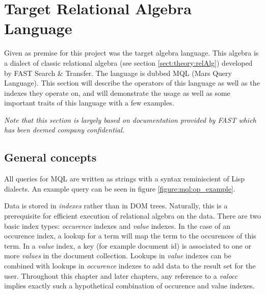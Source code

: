 \section{Target Relational Algebra Language}
\label{sect:method:mql}
Given as premise for this project was the target algebra language. This
algebra is a dialect of classic relational algebra (see section
\ref{sect:theory:relAlg}) developed by FAST Search \& Transfer. The language
is dubbed MQL (Mars Query Language). This section will describe the operators
of this language as well as the indexes they operate on, and will demonstrate
the usage as well as some important traits of this language with a few
examples.

\emph{Note that this section is largely based on documentation provided by FAST which
has been deemed company confidential. }

\subsection{General concepts}
\label{sect:method:mql:indexes}
\label{sect:method:mql:concepts}
All queries for MQL are written as strings with a syntax reminiscient of Lisp
dialects. An example query can be seen in figure \ref{figure:mql:op_example}.

Data is stored in \textit{indexes} rather than in DOM trees. Naturally, this is a prerequisite for efficient
execution of relational algebra on the data. There are two basic index types: \textit{occurence} indexes and
\textit{value} indexes. In the case of an occurence index, a lookup for a term will map the term to the occurences
of this term. In a \textit{value} index, a key (for example document id) is associated to one or more
\textit{values} in the document collection. Lookups in \textit{value} indexes can be combined with lookups in
\textit{occurence} indexes to add data to the result set for the user.
Throughout this chapter and later chapters, any reference to a \textit{valocc}
implies exactly such a hypothetical combination of occurence and value indexes.

